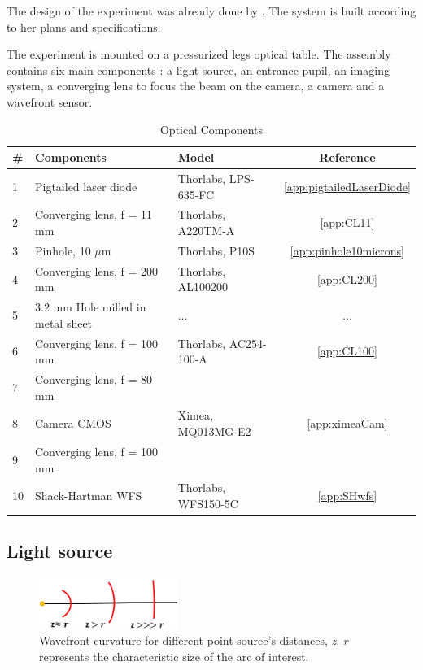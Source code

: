 The design of the experiment was already done by \citet{Bouxin_PDM}. The system is built according to her plans and specifications.

The experiment is mounted on a pressurized legs optical table. The assembly contains six main components : a light source, an entrance pupil, an imaging system, a converging lens to focus the beam on the camera, a camera and a wavefront sensor.


\begin{table}
\caption[Optical Components]{Optical Components}
\label{tab:optComp}
\centering
\begin{tabular}{|l|l|l|c|}
\hline
\textbf{\#}& \textbf{Components} & \textbf{Model} & \textbf{Reference} \\\hline
1 & Pigtailed laser diode & Thorlabs, LPS-635-FC & \ref{app:pigtailedLaserDiode} \\\hline
2 & Converging lens, f = 11 mm & Thorlabs, A220TM-A & \ref{app:CL11} \\\hline
3 & Pinhole, 10 $\mu$m & Thorlabs, P10S & \ref{app:pinhole10microns} \\\hline
4 & Converging lens, f = 200 mm & Thorlabs, AL100200 & \ref{app:CL200} \\\hline
5 & 3.2 mm Hole milled in metal sheet & ... & ... \\\hline
6 & Converging lens, f = 100 mm & Thorlabs, AC254-100-A & \ref{app:CL100} \\\hline
7 & Converging lens, f = 80 mm & & \\\hline
8 & Camera CMOS & Ximea, MQ013MG-E2 & \ref{app:ximeaCam} \\\hline
9 & Converging lens, f = 100 mm & & \\\hline
10 & Shack-Hartman WFS & Thorlabs, WFS150-5C & \ref{app:SHwfs} \\\hline
\end{tabular}
\end{table}

\subsection{Light source}
\label{subsec:LigthSource}

\begin{figure}
\centering
\includegraphics[width=0.4\textwidth]{Figures/WFdistantSource.PNG}
\decoRulewrapFig
\caption[Wavefront curvature]{Wavefront curvature for different point source's distances, \textit{z}. \textit{r} represents the characteristic size of the arc of interest.}
\label{fig:WFdistantSource}
\end{figure}

